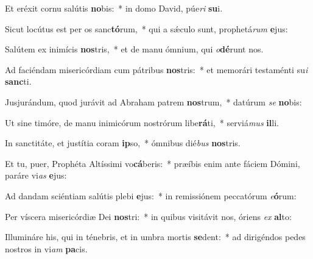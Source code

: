 \item Et eréxit cornu salútis \textbf{no}bis:~* in domo David, púe\textit{ri} \textbf{su}i.
\item Sicut locútus est per os sanc\textbf{tó}rum,~* qui a sǽculo sunt, prophetá\textit{rum} \textbf{e}jus:
\item Salútem ex inimícis \textbf{nos}tris,~* et de manu ómnium, qui \textit{o}\textbf{dé}runt nos.
\item Ad faciéndam misericórdiam cum pátribus \textbf{nos}tris:~* et memorári testaménti su\textit{i} \textbf{sanc}ti.
\item Jusjurándum, quod jurávit ad Abraham patrem \textbf{nos}trum,~* datúrum \textit{se} \textbf{no}bis:
\item Ut sine timóre, de manu inimicórum nostrórum libe\textbf{rá}ti,~* serviá\textit{mus} \textbf{il}li.
\item In sanctitáte, et justítia coram \textbf{ip}so,~* ómnibus dié\textit{bus} \textbf{nos}tris.
\item Et tu, puer, Prophéta Altíssimi vo\textbf{cá}beris:~* præíbis enim ante fáciem Dómini, paráre vi\textit{as} \textbf{e}jus:
\item Ad dandam sciéntiam salútis plebi \textbf{e}jus:~* in remissiónem peccatórum \textit{e}\textbf{ó}rum:
\item Per víscera misericórdiæ Dei \textbf{nos}tri:~* in quibus visitávit nos, óriens \textit{ex} \textbf{al}to:
\item Illumináre his, qui in ténebris, et in umbra mortis \textbf{se}dent:~* ad dirigéndos pedes nostros in vi\textit{am} \textbf{pa}cis.
